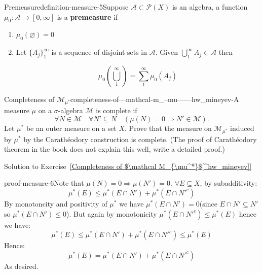 \begin{mystthmdefinition}{Premeasure}{definition-measure-5}Suppose $\mathcal A\subset \mathcal P(X)$ is an algebra, a function $\mu_0 : \mathcal A\to [0,\infty]$ is a \textbf{premeasure} if

\begin{enumerate}
\item $\mu_0(\varnothing)=0$
\item Let $\{A_j\}_1^{\infty}$ is a sequence of disjoint sets in $\mathcal A$. Given $\bigcup_1^{\infty} A_j \in \mathcal A$ then

\begin{equation}
\mu_0 \left( \bigcup_1^{\infty}\right) = \sum_{1}^{\infty} \mu_0(A_j)
\end{equation}
\end{enumerate}

\end{mystthmdefinition}
\begin{mystexercise}{Completeness of $\mathcal M_{\mu^*}$}{completeness-of---mathcal-m_--mu------hw_mineyev-}\label{Completeness of $\mathcal M_{\mu^*}$[^hw_mineyev]}\label{completeness of $\mathcal m_{\mu^*}$[^hw_mineyev]}A measure $\mu$ on a $\sigma$-algebra $\mathcal{M}$ is complete if
\begin{equation}
\forall N \in \mathcal{M} \quad \forall N' \subseteq N \quad (\mu(N) = 0 \Rightarrow N' \in \mathcal{M}).
\end{equation}
Let $\mu^*$ be an outer measure on a set $X$. Prove that the measure on $\mathcal{M}_{\mu^*}$ induced by $\mu^*$ by the Carathéodory construction is complete. (The proof of Carathéodory theorem in the book does not explain this well, write a detailed proof.)

\end{mystexercise}
\begin{mystsolution}{Solution to Exercise~\ref{Completeness of $\mathcal M_{\mu^*}$[^hw_mineyev]}}\begin{mystthmproof}{}{proof-measure-6}Note that $\mu(N)=0\Longrightarrow \mu(N')=0$. $\forall E\subseteq X$, by subadditivity:
\begin{equation}
\mu^*(E) \leq \mu^*(E\cap N') + \mu^*(E\cap N'^c)
\end{equation}
By monotoncity and positivity of $\mu^*$ we have $\mu^*(E\cap N')=0$(since $E\cap N' \subseteq N'$ so $\mu^*(E\cap N')\leq 0$). But again by monotonicity $\mu^*(E\cap N'^c) \leq \mu^*(E)$ hence we have:
\begin{equation}
\mu^*(E) \leq \mu^*(E\cap N') + \mu^*(E\cap N'^c) \leq \mu^*(E)
\end{equation}
Hence:
\begin{equation}
\mu^*(E) = \mu^*(E\cap N') + \mu^*(E\cap N'^c)
\end{equation}
As desired.

\end{mystthmproof}
\end{mystsolution}
